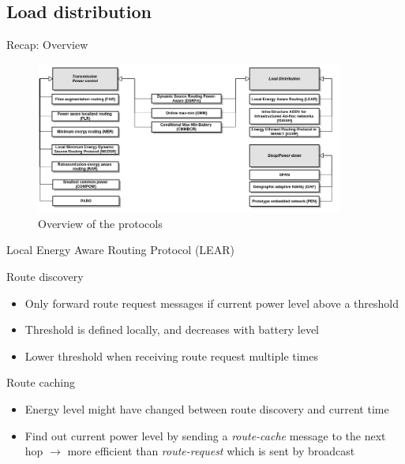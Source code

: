 \documentclass{beamer}
\begin{document}
\subsection{Load distribution}
\begin{frame}{Recap: Overview}
\begin{figure}
  \centering
  \includegraphics[width=0.9\textwidth]{images/overview}
  \caption{Overview of the protocols}
  
\end{figure}
\end{frame}
\begin{frame}{Local Energy Aware Routing Protocol (LEAR)\cite{woo2001non}}

\begin{block}{Route discovery}
\begin{itemize}
    \item Only forward route request messages if current power level above a threshold
    \item Threshold is defined locally, and decreases with battery level
    \item Lower threshold when receiving route request multiple times
\end{itemize}
\end{block}
\begin{block}{Route caching}
    \begin{itemize}
        \item Energy level might have changed between route discovery and current time
        \item Find out current power level by sending a \textit{route-cache} message to the next hop
                $\rightarrow$ more efficient than \textit{route-request} which is sent by broadcast
    \end{itemize}
\end{block}
\end{frame}
\end{document}
